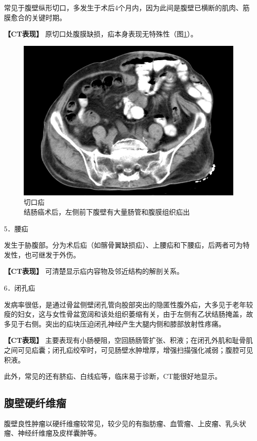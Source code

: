 常见于腹壁纵形切口，多发生于术后4个月内，因为此间是腹壁已横断的肌肉、筋膜愈合的关键时期。

\textbf{【CT表现】} 原切口处腹膜缺损，疝本身表现无特殊性（图\ref{fig18-10}）。

\begin{figure}[!htbp]
 \centering
 \includegraphics[width=.7\textwidth,height=\textheight,keepaspectratio]{./images/Image00380.jpg}
 \captionsetup{justification=centering}
 \caption{切口疝\\{\small 结肠癌术后，左侧前下腹壁有大量肠管和腹膜组织疝出}}
 \label{fig18-10}
  \end{figure} 

5．腰疝

发生于胁腹部。分为术后疝（如髂骨翼缺损疝）、上腰疝和下腰疝，后两者可为特发性，也可继发于外伤。

\textbf{【CT表现】} 可清楚显示疝内容物及邻近结构的解剖关系。

6．闭孔疝

发病率很低，是通过骨盆侧壁闭孔管向股部突出的隐匿性腹外疝，大多见于老年较瘦的妇女，这与女性骨盆宽阔和该处组织萎缩有关，由于左侧有乙状结肠掩盖，故多见于右侧。突出的疝块压迫闭孔神经产生大腿内侧和膝部放射性疼痛。

\textbf{【CT表现】}
主要表现有小肠梗阻，空回肠肠管扩张、积液；在闭孔外肌和耻骨肌之间可见疝囊；闭孔疝绞窄时，可见肠壁水肿增厚，增强扫描强化减弱；腹腔可见积液。

此外，常见的还有脐疝、白线疝等，临床易于诊断，CT能很好地显示。

\subsection{腹壁硬纤维瘤}

腹壁良性肿瘤以硬纤维瘤较常见，较少见的有脂肪瘤、血管瘤、上皮瘤、乳头状瘤、神经纤维瘤及皮样囊肿等。


